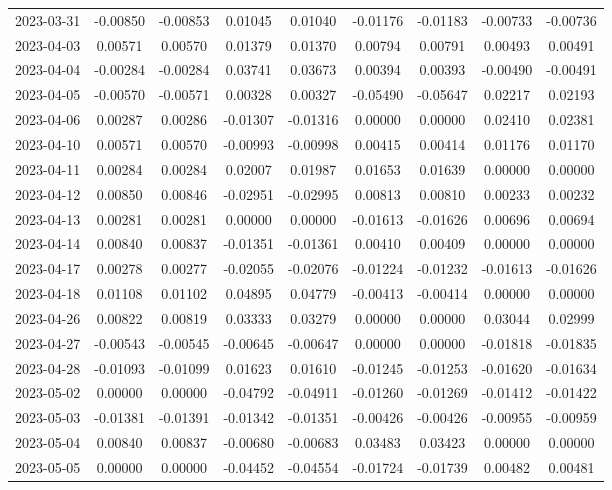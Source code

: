\begin{footnotesize}
\begin{longtable}{lcccccccc}
2023-03-31 & -0.00850 & -0.00853 & 0.01045 & 0.01040 & -0.01176 & -0.01183 & -0.00733 & -0.00736 \\
2023-04-03 & 0.00571 & 0.00570 & 0.01379 & 0.01370 & 0.00794 & 0.00791 & 0.00493 & 0.00491 \\
2023-04-04 & -0.00284 & -0.00284 & 0.03741 & 0.03673 & 0.00394 & 0.00393 & -0.00490 & -0.00491 \\
2023-04-05 & -0.00570 & -0.00571 & 0.00328 & 0.00327 & -0.05490 & -0.05647 & 0.02217 & 0.02193 \\
2023-04-06 & 0.00287 & 0.00286 & -0.01307 & -0.01316 & 0.00000 & 0.00000 & 0.02410 & 0.02381 \\
2023-04-10 & 0.00571 & 0.00570 & -0.00993 & -0.00998 & 0.00415 & 0.00414 & 0.01176 & 0.01170 \\
2023-04-11 & 0.00284 & 0.00284 & 0.02007 & 0.01987 & 0.01653 & 0.01639 & 0.00000 & 0.00000 \\
2023-04-12 & 0.00850 & 0.00846 & -0.02951 & -0.02995 & 0.00813 & 0.00810 & 0.00233 & 0.00232 \\
2023-04-13 & 0.00281 & 0.00281 & 0.00000 & 0.00000 & -0.01613 & -0.01626 & 0.00696 & 0.00694 \\
2023-04-14 & 0.00840 & 0.00837 & -0.01351 & -0.01361 & 0.00410 & 0.00409 & 0.00000 & 0.00000 \\
2023-04-17 & 0.00278 & 0.00277 & -0.02055 & -0.02076 & -0.01224 & -0.01232 & -0.01613 & -0.01626 \\
2023-04-18 & 0.01108 & 0.01102 & 0.04895 & 0.04779 & -0.00413 & -0.00414 & 0.00000 & 0.00000 \\
2023-04-26 & 0.00822 & 0.00819 & 0.03333 & 0.03279 & 0.00000 & 0.00000 & 0.03044 & 0.02999 \\
2023-04-27 & -0.00543 & -0.00545 & -0.00645 & -0.00647 & 0.00000 & 0.00000 & -0.01818 & -0.01835 \\
2023-04-28 & -0.01093 & -0.01099 & 0.01623 & 0.01610 & -0.01245 & -0.01253 & -0.01620 & -0.01634 \\
2023-05-02 & 0.00000 & 0.00000 & -0.04792 & -0.04911 & -0.01260 & -0.01269 & -0.01412 & -0.01422 \\
2023-05-03 & -0.01381 & -0.01391 & -0.01342 & -0.01351 & -0.00426 & -0.00426 & -0.00955 & -0.00959 \\
2023-05-04 & 0.00840 & 0.00837 & -0.00680 & -0.00683 & 0.03483 & 0.03423 & 0.00000 & 0.00000 \\
2023-05-05 & 0.00000 & 0.00000 & -0.04452 & -0.04554 & -0.01724 & -0.01739 & 0.00482 & 0.00481 \\

\end{longtable}
\end{footnotesize}
